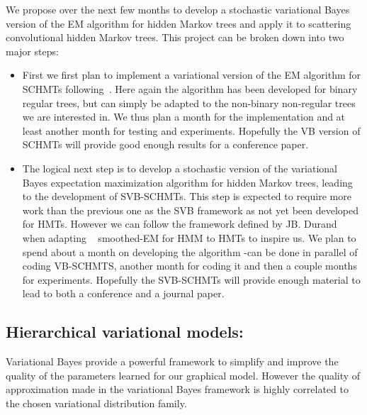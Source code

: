 \documentclass[a4paper,11pt]{report}
\begin{document}
    We propose over the next few months to develop a stochastic variational Bayes version of the EM algorithm for hidden Markov trees and apply it to scattering convolutional hidden Markov trees. This project can be broken down into two major steps:\\

    \begin{itemize}
      \item First we first plan to implement a variational version of the EM algorithm for SCHMTs following~\citep{olariu2009modified}. Here again the algorithm has been developed for binary regular trees, but can simply be adapted to the non-binary non-regular trees we are interested in. We thus plan a month for the implementation and at least another month for testing and experiments. Hopefully the VB version of SCHMTs will provide good enough results for a conference paper.\\
      
      \item The logical next step is to develop a stochastic version of the variational Bayes expectation maximization algorithm for hidden Markov trees, leading to the development of SVB-SCHMTs.  This step is expected to require more work than the previous one as the SVB framework as not yet been developed for HMTs. However we can follow the framework defined by JB. Durand~\citep{durand2004computational} when adapting ~\citep{devijver1985baum} smoothed-EM for HMM to HMTs to inspire us. We plan to spend about a month on developing the algorithm -can be done in parallel of coding VB-SCHMTS, another month for coding it and then a couple months for experiments. Hopefully the SVB-SCHMTs will provide enough material to lead to both a conference and a journal paper.\\
    \end{itemize}

  \subsection{Hierarchical variational models:}
  
    Variational Bayes provide a powerful framework to simplify and improve the quality of the parameters learned for our graphical model. However the quality of approximation made in the variational Bayes framework is highly correlated to the chosen variational distribution family.\\
    
\end{document}
